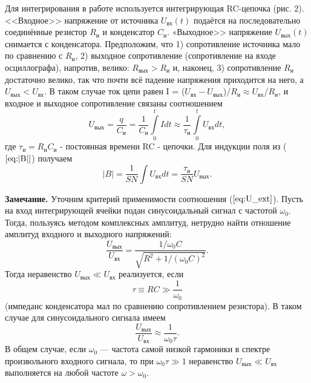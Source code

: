 Для интегрирования в работе используется интегрирующая RC-цепочка (рис. 2).<<Входное>> напряжение от источника $U_{вх}(t)$ подаётся на последовательно соединённые резистор $R_и$ и конденсатор $C_и$. «Выходное>>
напряжение $U_{вых}(t)$ снимается с конденсатора.
 Предположим, что 1) сопротивление источника мало по сравнению с $R_и$,
  2) выходное сопротивление (сопротивление на входе осциллографа), напротив, велико: $R_{вых} > R_и$ и, наконец, 3) сопротивление $R_и$ достаточно велико, так что почти всё падение напряжения приходится на него, а $U_{вых} < U_{вх}$. В таком случае ток цепи равен I = ($U_{вх} - U_{вых}$)/$R_и \approx U_{вх}$/$R_и$, и входное и выходное сопротивление связаны соотношением
\begin{equation}
    U_{вых} = \frac{q}{C_и} = \frac{1}{C_и}\int\limits_0^t Idt \approx \frac{1}{\tau_и} \int\limits_0^t U_{вх}dt,
    \label{eq:U_ext}
\end{equation}
где $\tau_и=R_иC_и$ - постоянная времени RC - цепочки. Для индукции поля из ($\ref{eq:|B|}$) получаем 
\begin{equation}
    |B|=\frac{1}{SN}\int U_{вх} dt=\frac{\tau_и}{SN}U_{вых}.
    \label{eq:|B|new}
\end{equation}

\textbf{Замечание.} Уточним критерий применимости соотношения ($\ref{eq:U_ext}$). Пусть на вход интегрирующей ячейки подан синусоидальный сигнал с частотой $\omega_0$. Тогда, пользуясь методом комплексных амплитуд, нетрудно найти отношение амплитуд входного и выходного напряжений:
\begin{equation}
    \frac{U_{вых}}{U_{вх}}=\frac{1/\omega_0C}{\sqrt{R^2+1/(\omega_0C)^2}}.
\end{equation}
Тогда неравенство $U_{вых} \ll U_{вх}$ реализуется, если 
\begin{equation}
    \tau \equiv RC\gg \frac{1}{\omega_0}
\end{equation}
(импеданс конденсатора мал по сравнению сопротивлением резистора).
В таком случае для синусоидального сигнала имеем
\begin{equation}
    \frac{U_{вых}}{U_{вх}}\approx\frac{1}{\omega_0\tau}.
\end{equation}
В общем случае, если $\omega_0$ — частота самой низкой гармоники в спектре
произвольного входного сигнала, то при $\omega_0\tau \gg 1$ неравенство $U_{вых} \ll U_{вх}$ выполняется на любой частоте $\omega > \omega_0$.

